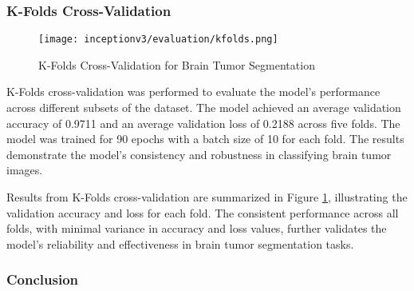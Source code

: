 \subsubsection{K-Folds Cross-Validation}

\begin{figure}[H]
  \begin{center}
    \texttt{[image: inceptionv3/evaluation/kfolds.png]}
  \end{center}
  \caption{K-Folds Cross-Validation for Brain Tumor Segmentation}\label{f:inceptionv3_kfolds}
\end{figure}

K-Folds cross-validation was performed to evaluate the model's performance across different subsets of the dataset. The model achieved an average validation accuracy of 0.9711 and an average validation loss of 0.2188 across five folds. The model was trained for 90 epochs with a batch size of 10 for each fold. The results demonstrate the model's consistency and robustness in classifying brain tumor images.

Results from K-Folds cross-validation are summarized in Figure \ref{f:inceptionv3_kfolds}, illustrating the validation accuracy and loss for each fold. The consistent performance across all folds, with minimal variance in accuracy and loss values, further validates the model's reliability and effectiveness in brain tumor segmentation tasks.



\subsubsection{Conclusion}


